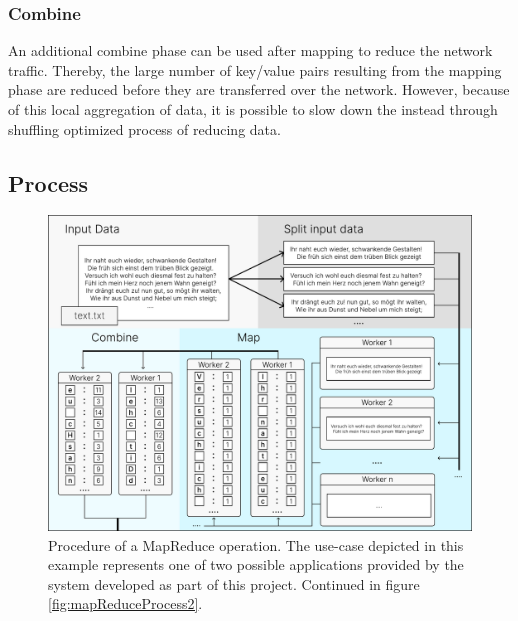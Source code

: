 \documentclass[12pt, letterpaper]{article}
\begin{document}
\subsubsection{Combine}
An additional combine phase can be used after mapping to reduce the network traffic. Thereby, the large number of key/value pairs resulting from the mapping phase are reduced before they are transferred over the network. However, because of this local aggregation of data, it is possible to slow down the instead through shuffling optimized process of reducing data.

\pagebreak
\subsection{Process}

\begin{figure}[h]
	\centering
	\includegraphics[width=0.9\linewidth]{img/MapReduceAblaufPart1}
	\caption{Procedure of a MapReduce operation. The use-case depicted in this example represents one of two possible applications provided by the system developed as part of this project. Continued in figure \ref{fig:mapReduceProcess2}.}
	\label{fig:mapReduceProcess1}
\end{figure}
\end{document}
